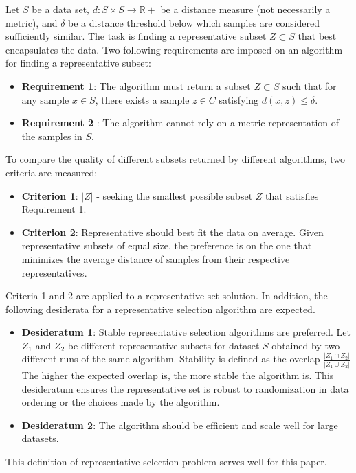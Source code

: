 \documentclass[thesis=B,english]{FITthesis}[2012/10/20]
\begin{document}
Let $S$ be a data set, $d : S \times S \to \mathbb{R} +$ be a distance measure (not necessarily a metric), and $\delta$ be a distance threshold below which samples are considered sufficiently similar.
The task is finding a representative subset $Z \subset S$ that best encapsulates the data.
Two following requirements are imposed on an algorithm for finding a representative subset:
\begin{itemize}
    \item \textbf{Requirement 1}: The algorithm must return a subset $Z \subset S$ such that for any sample $x \in S$, there exists a sample $z \in C$ satisfying $d(x, z) \le \delta$.
    \item \textbf{Requirement 2} : The algorithm cannot rely on a metric representation of the samples in $S$.
\end{itemize}
To compare the quality of different subsets returned by different algorithms, two criteria are measured:
\begin{itemize}
    \item \textbf{Criterion 1}: $|Z|$ - seeking the smallest possible subset $Z$ that satisfies Requirement 1.
    \item \textbf{Criterion 2}: Representative should best fit the data on average. Given representative subsets of equal size, the preference is on the one that minimizes the average distance of samples from their respective representatives.
\end{itemize}
Criteria 1 and 2 are applied to a representative set solution.
In addition, the following desiderata for a representative selection algorithm are expected.
\begin{itemize}
    \item \textbf{Desideratum 1}: Stable representative selection algorithms are preferred. Let $Z_1$ and $Z_2$ be different representative subsets for dataset $S$ obtained by two different runs of the same algorithm.
Stability is defined as the overlap $\frac{|Z_1 \cap Z_2|}{|Z_1 \cup Z_2|}$      The higher the expected overlap is, the more stable the algorithm is.
This desideratum ensures the representative set is robust to randomization in data ordering or the choices made by the algorithm.
    \item \textbf{Desideratum 2}: The algorithm should be efficient and scale
well for large datasets.
\end{itemize}

This definition of representative selection problem serves well for this paper.
\end{document}
